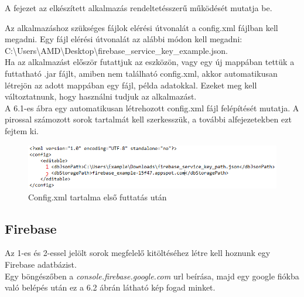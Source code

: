 
A fejezet az elkészített alkalmazás rendeltetésszerű működését mutatja be.

Az alkalmazáshoz szükséges fájlok elérési útvonalát a config.xml fájlban kell megadni.
Egy fájl elérési útvonalát az alábbi módon kell megadni: \\C:\textbackslash Users\textbackslash AMD\textbackslash Desktop\textbackslash firebase\_service\_key\_example.json.
\vspace{5pt}\\Ha az alkalmazást először futattjuk az eszközön, vagy egy új mappában tettük a futtatható .jar fájlt, amiben nem található config.xml, akkor automatikusan létrejön az adott mappában egy fájl, példa adatokkal. Ezeket meg kell változtatnunk, hogy használni tudjuk az alkalmazást.
\vspace{15pt}\\A 6.1-es ábra egy automatikusan létrehozott config.xml fájl felépítését mutatja. A pirossal számozott sorok tartalmát kell szerkesszük, a további alfejezetekben ezt fejtem ki.
\begin{figure}[h]
	\centering
	\includegraphics[scale=0.5]{images/config_1.png}
	\caption{Config.xml tartalma első futtatás után}
	\label{fig:config_file}
\end{figure}

\subsection{Firebase}
Az 1-es és 2-essel jelölt sorok megfelelő kitöltéséhez létre kell hoznunk egy Firebase adatbázist. 
\vspace{5pt}\\Egy böngészőben a \textit{console.firebase.google.com} url beírása, majd egy google fiókba való belépés után ez a 6.2 ábrán látható kép fogad minket.

